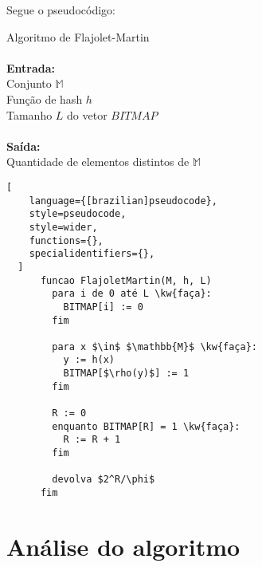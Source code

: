 Segue o pseudocódigo:
\begin{programruledcaption}{
Algoritmo de Flajolet-Martin \\
\\ \textbf{Entrada:} \\
\hspace*{1cm} Conjunto $\mathbb{M}$ \\
\hspace*{1cm} Função de hash $h$ \\
\hspace*{1cm} Tamanho $L$ do vetor $BITMAP$ \\
\\ \textbf{Saída:} \\
\hspace*{1cm} Quantidade de elementos distintos de $\mathbb{M}$
}\label{prog:flajolet-martin}
  \begin{lstlisting}[
    language={[brazilian]pseudocode},
    style=pseudocode,
    style=wider,
    functions={},
    specialidentifiers={},
  ]
      funcao FlajoletMartin(M, h, L)
        para i de 0 até L \kw{faça}:
          BITMAP[i] := 0
        fim

        para x $\in$ $\mathbb{M}$ \kw{faça}:
          y := h(x)
          BITMAP[$\rho(y)$] := 1
        fim

        R := 0
        enquanto BITMAP[R] = 1 \kw{faça}:
          R := R + 1
        fim

        devolva $2^R/\phi$
      fim
  \end{lstlisting}
\end{programruledcaption}

\section{Análise do algoritmo}
\label{sec:flajolet-martin-analysis}